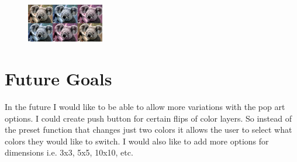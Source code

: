 \documentclass[a4paper]{article}
\begin{document}
\begin{figure}
\centering
\includegraphics[width=0.3\textwidth]{vallex2.PNG}
\caption{\label{fig:Vallefuoco example 2}}
\end{figure}

\section{Future Goals}
In the future I would like to be able to allow more variations with the pop art options. I could create push button for certain flips of color layers. So instead of the preset function that changes just two colors it allows the user to select what colors they would like to switch. I would also like to add more options for dimensions i.e. 3x3, 5x5, 10x10, etc.
\end{document}
